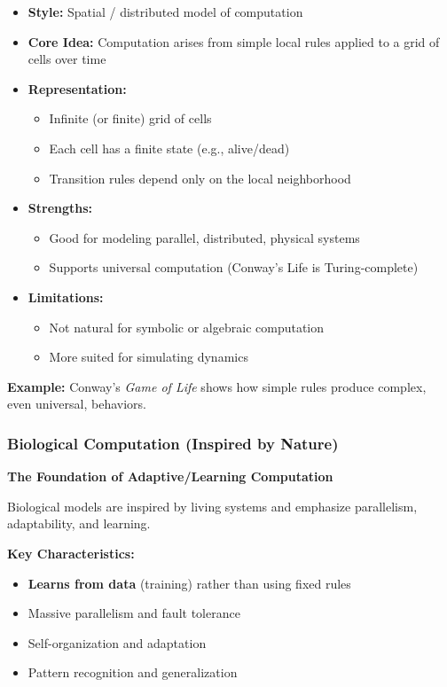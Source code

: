 \begin{itemize}
\item \textbf{Style:} Spatial / distributed model of computation
\item \textbf{Core Idea:} Computation arises from simple local rules applied to a grid of cells over time
\item \textbf{Representation:}
\begin{itemize}
\item Infinite (or finite) grid of cells
\item Each cell has a finite state (e.g., alive/dead)
\item Transition rules depend only on the local neighborhood
\end{itemize}
\item \textbf{Strengths:}
\begin{itemize}
\item Good for modeling parallel, distributed, physical systems
\item Supports universal computation (Conway's Life is Turing-complete)
\end{itemize}
\item \textbf{Limitations:}
\begin{itemize}
\item Not natural for symbolic or algebraic computation
\item More suited for simulating dynamics
\end{itemize}
\end{itemize}

\textbf{Example:} Conway's \textit{Game of Life} shows how simple rules produce complex, even universal, behaviors.

\subsubsection{Biological Computation (Inspired by Nature)}

\textbf{The Foundation of Adaptive/Learning Computation}

Biological models are inspired by living systems and emphasize parallelism, adaptability, and learning.

\textbf{Key Characteristics:}

\begin{itemize}
\item \textbf{Learns from data} (training) rather than using fixed rules
\item Massive parallelism and fault tolerance
\item Self-organization and adaptation
\item Pattern recognition and generalization
\end{itemize}

